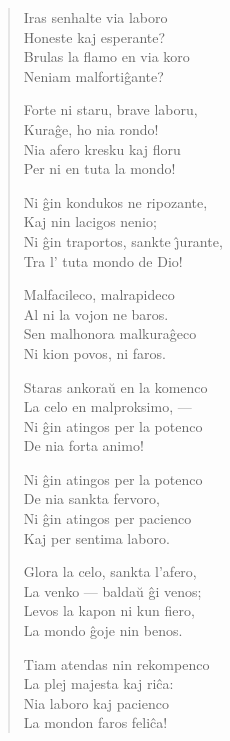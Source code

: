 \begin{verse}
                    \vin    Iras senhalte via laboro\\
                    \vin    Honeste kaj esperante?\\
                    \vin    Brulas la flamo en via koro\\
                    \vin    Neniam malforti\^gante?

                   Forte ni staru, brave laboru,\\
                   Kura\^ge, ho nia rondo!\\
                   Nia afero kresku kaj floru\\
                   Per ni en tuta la mondo!

                    \vin    Ni \^gin kondukos ne ripozante,\\
                    \vin    Kaj nin lacigos nenio;\\
                     \vin   Ni \^gin traportos, sankte \^{\j}urante,\\
                    \vin    Tra l' tuta mondo de Dio!

                   Malfacileco, malrapideco\\
                   Al ni la vojon ne baros.\\
                   Sen malhonora malkura\^geco\\
                   Ni kion povos, ni faros.

                   \vin     Staras ankora\u u en la komenco\\
                    \vin    La celo en malproksimo, ---\\
                    \vin    Ni \^gin atingos per la potenco\\
                    \vin    De nia forta animo!

                   Ni \^gin atingos per la potenco\\
                   De nia sankta fervoro,\\
                   Ni \^gin atingos per pacienco\\
                   Kaj per sentima laboro.

                    \vin    Glora la celo, sankta l'afero,\\
                    \vin    La venko --- balda\u u \^gi venos;\\
                    \vin    Levos la kapon ni kun fiero,\\
                    \vin    La mondo \^goje nin benos.

                   Tiam atendas nin rekompenco\\
                   La plej majesta kaj ri\^ca:\\
                   Nia laboro kaj pacienco\\
                   La mondon faros feli\^ca!

\end{verse}


\smallrule{}

